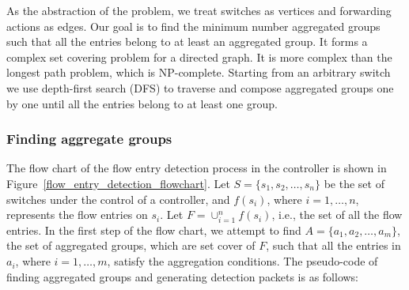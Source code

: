 \documentclass[conference]{IEEEtran}
\begin{document}
As the abstraction of the problem, we treat switches as vertices and forwarding actions as edges. Our goal is to find the minimum number aggregated groups such that all the entries belong to at least an aggregated group. It forms a complex set covering problem for a directed graph. It is more complex than the longest path problem, which is NP-complete. Starting from an arbitrary switch we use depth-first search (DFS) to traverse and compose aggregated groups one by one until all the entries belong to at least one group. 

\subsubsection{Finding aggregate groups}
\label{Aggregated_group_finding}

The flow chart of the flow entry detection process in the controller is shown in Figure~\ref{flow_entry_detection_flowchart}. Let $S=\{s_1,s_2,\ldots,s_n\}$ be the set of switches under the control of a controller, and $f(s_i)$, where $i=1,\ldots,n$, represents the flow entries on $s_i$. Let $F=\cup_{i=1}^n f(s_i)$, i.e., the set of all the flow entries. In the first step of the flow chart, we attempt to find $A=\{a_1, a_2, \ldots, a_m\}$, the set of aggregated groups, which are set cover of $F$, such that all the entries in $a_i$, where $i=1,\ldots,m$, satisfy the aggregation conditions. The pseudo-code of finding aggregated groups and generating detection packets is as follows:
\end{document}
